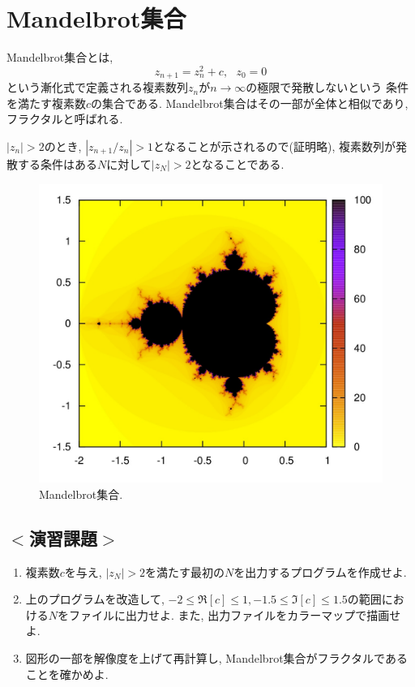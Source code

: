 \documentclass[a4j]{jsbook}
\begin{document}
\section{Mandelbrot集合}
Mandelbrot集合とは,
\begin{equation}
z_{n+1}=z_n^2+c, \ \ \ z_0=0
\end{equation}
という漸化式で定義される複素数列$z_n$が$n \to \infty$の極限で発散しないという
条件を満たす複素数$c$の集合である.
Mandelbrot集合はその一部が全体と相似であり, フラクタルと呼ばれる.

$|z_n|>2$のとき, $|z_{n+1}/z_n|>1$となることが示されるので(証明略),
複素数列が発散する条件はある$N$に対して$|z_N|>2$となることである.

\begin{figure}[ht]
\centering
\includegraphics[width=0.75\linewidth]{source/figure/mandel}
\caption{Mandelbrot集合. }
\end{figure}

\subsection*{$<$演習課題$>$}
\begin{enumerate}
\item 複素数$c$を与え, $|z_N|>2$を満たす最初の$N$を出力するプログラムを作成せよ.
\item 上のプログラムを改造して, $-2 \le \Re[c] \le 1, -1.5 \le \Im[c] \le 1.5$の範囲における$N$をファイルに出力せよ.
また, 出力ファイルをカラーマップで描画せよ.
\item 図形の一部を解像度を上げて再計算し, Mandelbrot集合がフラクタルであることを確かめよ.
\end{enumerate}
\end{document}
